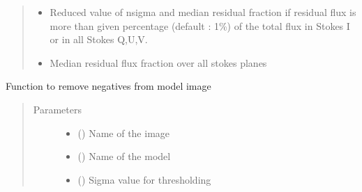 \documentclass[letterpaper,10pt,english]{sphinxmanual}
\begin{document}
\begin{fulllineitems}
\begin{fulllineitems}
\begin{quote}
\begin{description}
\begin{itemize}
\end{itemize}

\item[{Returns}] \leavevmode
\sphinxAtStartPar
\begin{itemize}
\item {} 
\sphinxAtStartPar
{} \textendash{} Reduced value of n\sphinxhyphen{}sigma and median residual fraction if residual flux is more than given percentage (default : 1\%) of the total flux in Stokes I or in all Stokes Q,U,V.

\item {} 
\sphinxAtStartPar
{} \textendash{} Median residual flux fraction over all stokes planes

\end{itemize}


\end{description}\end{quote}

\end{fulllineitems}


\begin{fulllineitems}
\label{\detokenize{paircars:paircars.fullpol_selfcal_LTS.PolSelfcal.remove_model_negative}}
\sphinxAtStartPar
Function to remove negatives from model image
\begin{quote}\begin{description}
\item[{Parameters}] \leavevmode\begin{itemize}
\item {} 
\sphinxAtStartPar
{} () \textendash{} Name of the image

\item {} 
\sphinxAtStartPar
{} () \textendash{} Name of the model

\item {} 
\sphinxAtStartPar
{} () \textendash{} Sigma value for thresholding


\end{itemize}
\end{description}
\end{quote}
\end{fulllineitems}
\end{fulllineitems}
\end{document}
